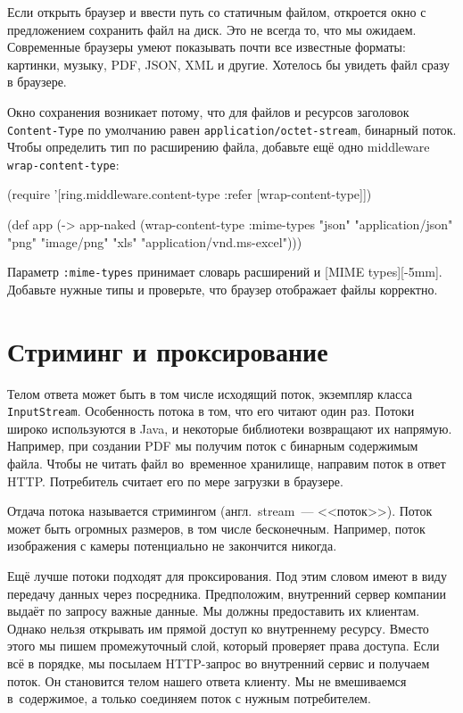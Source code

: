 Если открыть браузер и ввести путь со статичным файлом, откроется окно с
предложением сохранить файл на диск. Это не всегда то, что мы
ожидаем. Современные браузеры умеют показывать почти все известные форматы:
картинки, музыку, PDF, JSON, XML и другие. Хотелось бы увидеть файл сразу в
браузере.

Окно сохранения возникает потому, что для файлов и ресурсов заголовок
\verb|Content-Type| по умолчанию равен \verb|application/octet-stream|,
бинарный поток. Чтобы определить тип по расширению файла, добавьте ещё одно
middleware \verb|wrap-content-type|:

\begin{english}
  \begin{clojure}
(require '[ring.middleware.content-type
           :refer [wrap-content-type]])

(def app
  (-> app-naked
      (wrap-content-type
       {:mime-types {"json" "application/json"
                      "png" "image/png"
                      "xls" "application/vnd.ms-excel"}})))
  \end{clojure}
\end{english}

Параметр \verb|:mime-types| принимает словарь расширений и
[MIME types][-5mm]. Добавьте нужные типы и
проверьте, что браузер отображает файлы корректно.


\section{Стриминг и проксирование}

Телом ответа может быть в том числе исходящий поток, экземпляр класса
\verb|InputStream|. Особенность потока в том, что его читают один раз. Потоки
широко используются в Java, и некоторые библиотеки возвращают их
напрямую. Например, при создании PDF мы получим поток с бинарным содержимым
файла. Чтобы не читать файл во~временное хранилище, направим поток в ответ
HTTP. Потребитель считает его по мере загрузки в браузере.

Отдача потока называется стримингом (англ.~stream~--- <<поток>>). Поток может быть
огромных размеров, в том числе бесконечным. Например, поток изображения с камеры
потенциально не закончится никогда.

Ещё лучше потоки подходят для проксирования. Под этим словом имеют в виду
передачу данных через посредника. Предположим, внутренний сервер компании
выдаёт по запросу важные данные. Мы должны предоставить их клиентам. Однако
нельзя открывать им прямой доступ ко внутреннему ресурсу. Вместо этого мы пишем
промежуточный слой, который проверяет права доступа. Если всё в порядке, мы
посылаем HTTP-запрос во внутренний сервис и получаем поток. Он становится телом
нашего ответа клиенту. Мы не вмешиваемся в~содержимое, а только соединяем поток с
нужным потребителем.

